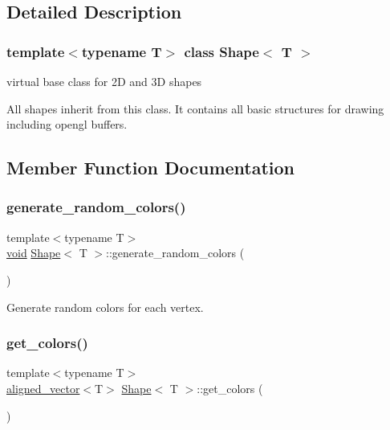 \subsection{Detailed Description}
\subsubsection*{template$<$typename T$>$\newline
class Shape$<$ T $>$}

virtual base class for 2D and 3D shapes 

All shapes inherit from this class. It contains all basic structures for drawing including opengl buffers. 

\subsection{Member Function Documentation}
\mbox{\label{classShape_aabeb601fe95b412987d5b5c276bf8a7a}} 
\subsubsection{\texorpdfstring{generate\+\_\+random\+\_\+colors()}{generate\_random\_colors()}}
{\footnotesize\ttfamily template$<$typename T$>$ \\
\mbox{\hyperlink{glad_8h_a950fc91edb4504f62f1c577bf4727c29}{void}} \mbox{\hyperlink{classShape}{Shape}}$<$ T $>$\+::generate\+\_\+random\+\_\+colors (\begin{DoxyParamCaption}{ }\end{DoxyParamCaption})\hspace{0.3cm}{\ttfamily [inline]}}



Generate random colors for each vertex. 

\mbox{\label{classShape_aabe9bd208b0ece9824cb45deccc11ba7}} 
\subsubsection{\texorpdfstring{get\+\_\+colors()}{get\_colors()}}
{\footnotesize\ttfamily template$<$typename T$>$ \\
\mbox{\hyperlink{type__definitions_8hpp_a087efd587d66b881646ef378f1919c90}{aligned\+\_\+vector}}$<$T$>$ \mbox{\hyperlink{classShape}{Shape}}$<$ T $>$\+::get\+\_\+colors (\begin{DoxyParamCaption}{ }\end{DoxyParamCaption})\hspace{0.3cm}{\ttfamily [inline]}}


